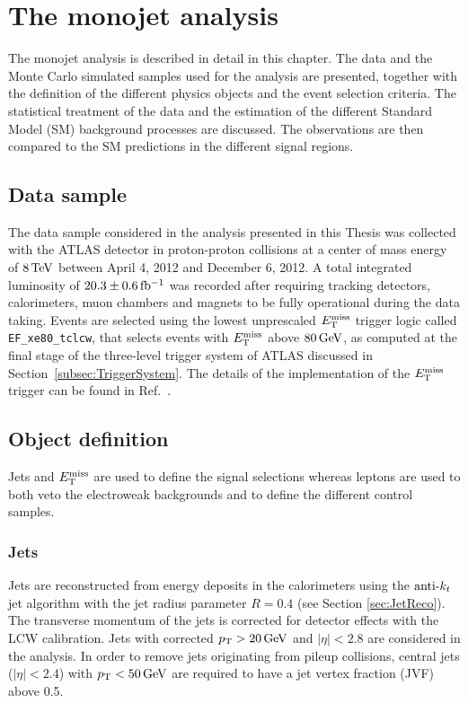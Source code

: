 \chapter{The monojet analysis}
    \label{chapter:MonojetAnalysis}

The monojet analysis is described in detail in this chapter.
The data and the Monte Carlo simulated samples used for the analysis are presented, together with the definition of the different physics objects and the event selection criteria.
The statistical treatment of the data and the estimation of the different Standard Model (SM) background processes are discussed.
The observations are then compared to the SM predictions in the different signal regions.


\section{Data sample}
    \label{sec:DataSample}

The data sample considered in the analysis presented in this Thesis was collected with the ATLAS detector in proton-proton collisions at a center of mass energy of $\unit[8]{TeV}$ between April 4, 2012 and December 6, 2012.
A total integrated luminosity of  $\unit[20.3 \pm 0.6]{fb^{-1}}$ was recorded after requiring tracking detectors, calorimeters, muon chambers and magnets to be fully operational during the data taking.
Events are selected using the lowest unprescaled $E_{\mathrm{T}}^{\mathrm{miss}}$ trigger logic called \texttt{EF\_xe80\_tclcw}, that selects events with $E_{\mathrm{T}}^{\mathrm{miss}}$ above $\unit[80]{GeV}$, as computed at the final stage of the three-level trigger system of ATLAS discussed in Section~\ref{subsec:TriggerSystem}. 
The details of the implementation of the $E_{\mathrm{T}}^{\mathrm{miss}}$ trigger can be found in Ref.~\cite{Casadei:2011via}.


\section{Object definition}
    \label{sec:ObjectDefinition}

Jets and $E_{\mathrm{T}}^{\mathrm{miss}}$ are used to define the signal selections whereas leptons are used to both veto the electroweak backgrounds and to define the different control samples.


\subsection{Jets}
    \label{subsec:JetDefinition}

Jets are reconstructed from energy deposits in the calorimeters using the $\hbox{anti-${k_t}$}$ jet algorithm with the jet radius parameter $R=0.4$ (see Section \ref{sec:JetReco}).
The transverse momentum of the jets is corrected for detector effects with the LCW calibration.
Jets with corrected $\pt>\unit[20]{GeV}$ and $|\eta|<2.8$ are considered in the analysis.
In order to remove jets originating from pileup collisions, central jets ($|\eta|<2.4$) with $\pt < \unit[50]{GeV}$ are required to have a jet vertex fraction (JVF) above 0.5.


